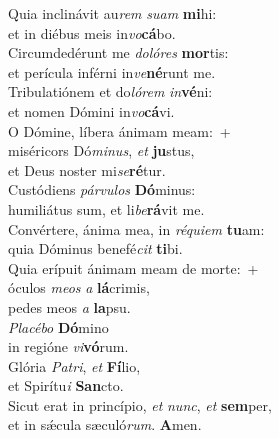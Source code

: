 \evenverse Quia inclinávit au\textit{rem} \textit{su}\textit{am} \textbf{mi}hi:~\*\\
\evenverse et in diébus meis in\textit{vo}\textbf{cá}bo.\\
\oddverse Circumdedérunt me \textit{do}\textit{ló}\textit{res} \textbf{mor}tis:~\*\\
\oddverse et perícula inférni in\textit{ve}\textbf{né}runt me.\\
\evenverse Tribulatiónem et do\textit{ló}\textit{rem} \textit{in}\textbf{vé}ni:~\*\\
\evenverse et nomen Dómini in\textit{vo}\textbf{cá}vi.\\
\oddverse O Dómine, líbera ánimam meam:~+\\
\oddverse  miséricors Dó\textit{mi}\textit{nus}, \textit{et} \textbf{ju}stus,~\*\\
\oddverse et Deus noster mi\textit{se}\textbf{ré}tur.\\
\evenverse Custódiens \textit{pár}\textit{vu}\textit{los} \textbf{Dó}minus:~\*\\
\evenverse humiliátus sum, et li\textit{be}\textbf{rá}vit me.\\
\oddverse Convértere, ánima mea, in \textit{ré}\textit{qui}\textit{em} \textbf{tu}am:~\*\\
\oddverse quia Dóminus benefé\textit{cit} \textbf{ti}bi.\\
\evenverse Quia erípuit ánimam meam de morte:~+\\
\evenverse  óculos \textit{me}\textit{os} \textit{a} \textbf{lá}crimis,~\*\\
\evenverse pedes meos \textit{a} \textbf{la}psu.\\
\oddverse \textit{Pla}\textit{cé}\textit{bo} \textbf{Dó}mino~\*\\
\oddverse in regióne \textit{vi}\textbf{vó}rum.\\
\evenverse Glória \textit{Pa}\textit{tri}, \textit{et} \textbf{Fí}lio,~\*\\
\evenverse et Spirítu\textit{i} \textbf{San}cto.\\
\oddverse Sicut erat in princípio, \textit{et} \textit{nunc}, \textit{et} \textbf{sem}per,~\*\\
\oddverse et in sǽcula sæculó\textit{rum}. \textbf{A}men.\\
